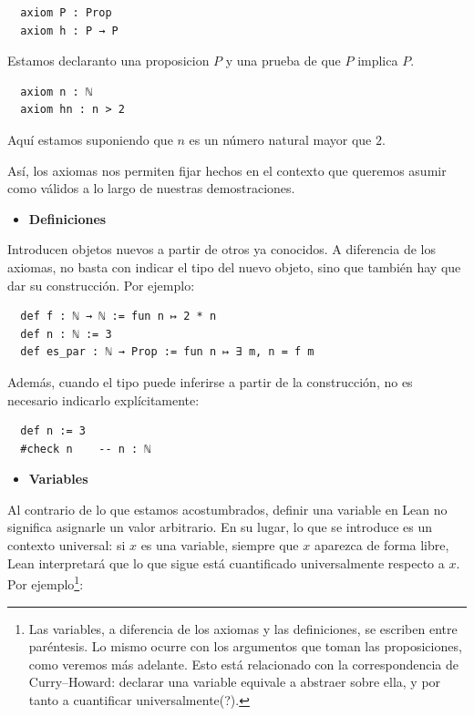 \documentclass{article}
\begin{document}
\begin{lstlisting}
  axiom P : Prop
  axiom h : P → P
\end{lstlisting}

Estamos declaranto una proposicion $P$ y una prueba de que $P$ implica $P$.

\begin{lstlisting}
  axiom n : ℕ
  axiom hn : n > 2
\end{lstlisting}

Aquí estamos suponiendo que $n$ es un número natural mayor que $2$.

Así, los axiomas nos permiten fijar hechos en el contexto que queremos asumir como válidos a lo largo de nuestras demostraciones.


\begin{itemize}
  \item \textbf{Definiciones}
\end{itemize}

Introducen objetos nuevos a partir de otros ya conocidos. A diferencia de los axiomas, no  basta con indicar el tipo del nuevo objeto, sino que también hay que dar su construcción. Por ejemplo:

\begin{lstlisting}
  def f : ℕ → ℕ := fun n ↦ 2 * n
  def n : ℕ := 3
  def es_par : ℕ → Prop := fun n ↦ ∃ m, n = f m
\end{lstlisting}

Además, cuando el tipo puede inferirse a partir de la construcción, no es necesario indicarlo explícitamente:

\begin{lstlisting}
  def n := 3
  #check n    -- n : ℕ
\end{lstlisting}

\begin{itemize}
  \item \textbf{Variables}
\end{itemize}

Al contrario de lo que estamos acostumbrados, definir una variable en Lean no significa asignarle un valor arbitrario. En su lugar, lo que se introduce es un contexto universal: si $x$ es una variable, siempre que $x$ aparezca de forma libre, Lean interpretará que lo que sigue está cuantificado universalmente respecto a $x$. Por ejemplo\footnote{Las variables, a diferencia de los axiomas y las definiciones, se escriben entre paréntesis. Lo mismo ocurre con los argumentos que toman las proposiciones, como veremos más adelante. Esto está relacionado con la correspondencia de Curry–Howard: declarar una variable equivale a abstraer sobre ella, y por tanto a cuantificar universalmente(?).}:
\end{document}
